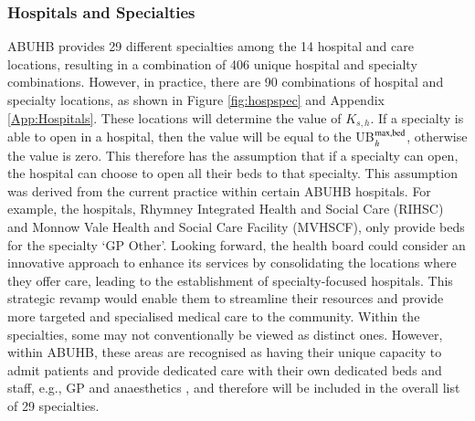 \documentclass[../thesis.tex]{subfiles}
\begin{document}
\subsubsection{Hospitals and Specialties}
ABUHB provides 29 different specialties among the 14 hospital and care locations, resulting in a combination of 406 unique hospital and specialty combinations. However, in practice, there are 90 combinations of hospital and specialty locations, as shown in Figure \ref{fig:hospspec} and Appendix \ref{App:Hospitals}. These locations will determine the value of $K_{s,h}$. If a specialty is able to open in a hospital, then the value will be equal to the UB$_{h}^{\textnormal{max,bed}}$, otherwise the value is zero. This therefore has the assumption that if a specialty can open, the hospital can choose to open all their beds to that specialty. This assumption was derived from the current practice within certain ABUHB hospitals. For example, the hospitals, Rhymney Integrated Health and Social Care (RIHSC) and Monnow Vale Health and Social Care Facility (MVHSCF), only provide beds for the specialty `GP Other'. Looking forward, the health board could consider an innovative approach to enhance its services by consolidating the locations where they offer care, leading to the establishment of specialty-focused hospitals. This strategic revamp would enable them to streamline their resources and provide more targeted and specialised medical care to the community. Within the specialties, some may not conventionally be viewed as distinct ones. However, within ABUHB, these areas are recognised as having their unique capacity to admit patients and provide dedicated care with their own dedicated beds and staff, e.g., GP and anaesthetics \cite{StatsWales2021}, and therefore will be included in the overall list of 29 specialties.
\end{document}
